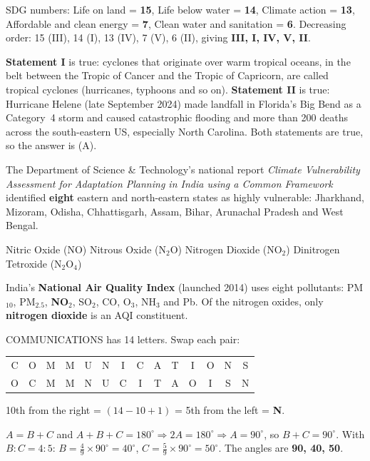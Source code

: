 SDG numbers: Life on land = \textbf{15}, Life below water = \textbf{14}, Climate action = \textbf{13}, Affordable and clean energy = \textbf{7}, Clean water and sanitation = \textbf{6}.
Decreasing order: 15 (III), 14 (I), 13 (IV), 7 (V), 6 (II), giving \textbf{III, I, IV, V, II}.

\textbf{Statement I} is true: cyclones that originate over warm tropical oceans, in the belt between the Tropic of Cancer and the Tropic of Capricorn, are called tropical cyclones (hurricanes, typhoons and so on).
\textbf{Statement II} is true: Hurricane Helene (late September 2024) made landfall in Florida's Big Bend as a Category~4 storm and caused catastrophic flooding and more than 200 deaths across the south-eastern US, especially North Carolina.
Both statements are true, so the answer is (A).

The Department of Science \& Technology's national report \emph{Climate Vulnerability Assessment for Adaptation Planning in India using a Common Framework} identified \textbf{eight} eastern and north-eastern states as highly vulnerable: Jharkhand, Mizoram, Odisha, Chhattisgarh, Assam, Bihar, Arunachal Pradesh and West Bengal.

Nitric Oxide (NO)
Nitrous Oxide (N$_2$O)
Nitrogen Dioxide (NO$_2$)
Dinitrogen Tetroxide (N$_2$O$_4$)

India's \textbf{National Air Quality Index} (launched 2014) uses eight pollutants: PM$_{10}$, PM$_{2.5}$, \textbf{NO$_2$}, SO$_2$, CO, O$_3$, NH$_3$ and Pb. Of the nitrogen oxides, only \textbf{nitrogen dioxide} is an AQI constituent.

COMMUNICATIONS has 14 letters. Swap each pair:
\begin{center}\ttfamily
\begin{tabular}{*{14}{c}}
C&O&M&M&U&N&I&C&A&T&I&O&N&S\\
O&C&M&M&N&U&C&I&T&A&O&I&S&N\\
\end{tabular}
\end{center}
10th from the right = $(14-10+1)$ = 5th from the left = \textbf{N}.

$A=B+C$ and $A+B+C=180^\circ \Rightarrow 2A=180^\circ \Rightarrow A=90^\circ$, so $B+C=90^\circ$.
With $B:C=4:5$: $B=\tfrac49\times90^\circ=40^\circ$, $C=\tfrac59\times90^\circ=50^\circ$. The angles are \textbf{90\textdegree, 40\textdegree, 50\textdegree}.

